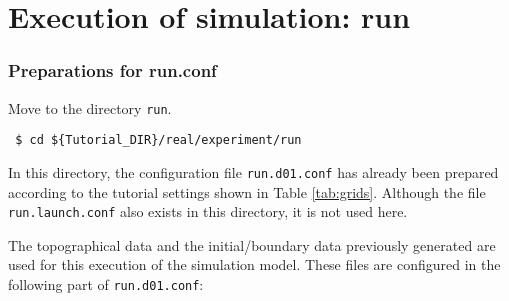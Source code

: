 \section{Execution of simulation: run} \label{sec:tutorial_real_run}
\subsubsection{Preparations for run.conf}
Move to the directory \verb|run|.
\begin{verbatim}
 $ cd ${Tutorial_DIR}/real/experiment/run
\end{verbatim}
In this directory, the configuration file \verb|run.d01.conf| has already been prepared according to the tutorial settings shown in Table \ref{tab:grids}. Although the file \verb|run.launch.conf| also exists in this directory, it is not used here.

The topographical data and the initial/boundary data previously generated  are used for this execution of the simulation model. These files are configured in the following part of \verb|run.d01.conf|:

